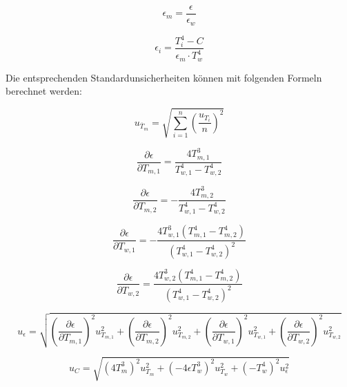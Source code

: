 \documentclass{article}
\begin{document}
\begin{equation}
    \epsilon_{m} = \frac{\epsilon}{\epsilon_{w}}
\end{equation}

\begin{equation}
    \epsilon_i = \frac{T_i^4 - C}{\epsilon_{m} \cdot T_w^4}
\end{equation}

Die entsprechenden Standardunsicherheiten können mit folgenden Formeln berechnet werden:

\begin{equation}
    u_{\overline T_m} = \sqrt{ \sum_{i=1}^n \left( \frac{u_{T_i}}{n} \right)^2 }
\end{equation}

\begin{equation}
    \frac{\partial \epsilon}{\partial T_{m,1}} = \frac{4T_{m,1}^3}{T_{w,1}^4 - T_{w,2}^4} 
\end{equation}

\begin{equation}
    \frac{\partial \epsilon}{\partial T_{m,2}} = -\frac{4T_{m,2}^3}{T_{w,1}^4 - T_{w,2}^4}
\end{equation}

\begin{equation}
    \frac{\partial \epsilon}{\partial T_{w,1}} = -\frac{4T_{w,1}^3 \left( T_{m,1}^4 - T_{m,2}^4 \right)}{\left( T_{w,1}^4 - T_{w,2}^4\right)^2} 
\end{equation}

\begin{equation}
    \frac{\partial \epsilon}{\partial T_{w,2}} =  \frac{4T_{w,2}^3 \left( T_{m,1}^4 - T_{m,2}^4 \right)}{\left( T_{w,1}^4 - T_{w,2}^4 \right)^2}
\end{equation}

\begin{equation}
    u_\epsilon = \sqrt{
        \left( \frac{\partial \epsilon}{\partial T_{m,1}} \right)^2 u_{T_{m,1}}^2 + 
        \left( \frac{\partial \epsilon}{\partial T_{m,2}} \right)^2 u_{T_{m,2}}^2 + 
        \left( \frac{\partial \epsilon}{\partial T_{w,1}} \right)^2 u_{T_{w,1}}^2 + 
        \left( \frac{\partial \epsilon}{\partial T_{w,2}} \right)^2 u_{T_{w,2}}^2
    }
\end{equation}

\begin{equation}
    u_C = \sqrt{\left( 4 T_m^3 \right)^2 u_{T_m}^2 + \left( -4 \epsilon T_w^3 \right)^2 u_{T_w}^2 + \left( -T_w^4 \right)^2  u_{\epsilon}^2} 
\end{equation}
\end{document}
